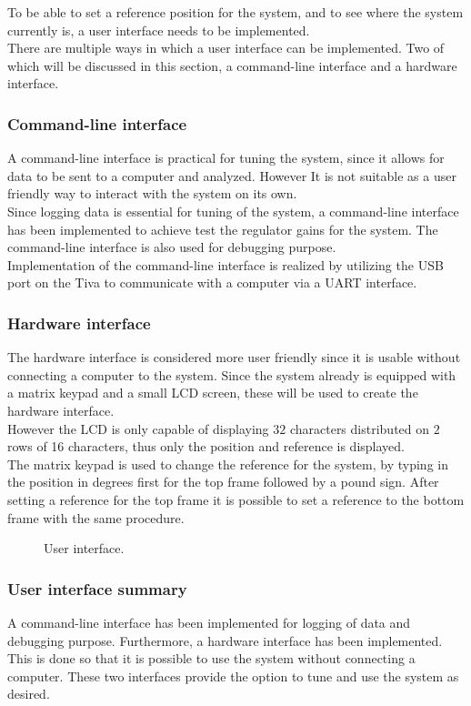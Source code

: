 \documentclass[../../../main]{subfiles}
\begin{document}
To be able to set a reference position for the system, and to see where the system currently is, a user interface needs to be implemented.\\
There are multiple ways in which a user interface can be implemented.
Two of which will be discussed in this section, a command-line interface and a hardware interface.

\subsubsection{Command-line interface}%
\label{ssub:command-line_interface}
A command-line interface is practical for tuning the system, since it allows for data to be sent to a computer and analyzed.
However It is not suitable as a user friendly way to interact with the system on its own.
\\
Since logging data is essential for tuning of the system, a command-line interface has been implemented to achieve test the regulator gains for the system.
The command-line interface is also used for debugging purpose.
\\
Implementation of the command-line interface is realized by utilizing the USB port on the Tiva to communicate with a computer via a UART interface.

\subsubsection{Hardware interface}%
\label{ssub:hardware_interface}
The hardware interface is considered more user friendly since it is usable without connecting a computer to the system.
Since the system already is equipped with a matrix keypad and a small LCD screen, these will be used to create the hardware interface.
\\
However the LCD is only capable of displaying $32$ characters distributed on $2$ rows of 16 characters, thus only the position and reference is displayed.
\\
The matrix keypad is used to change the reference for the system, by typing in the position in degrees first for the top frame followed by a pound sign. 
After setting a reference for the top frame it is possible to set a reference to the bottom frame with the same procedure. 

\begin{figure}[H]
  \centering
  \def\svgwidth{\textwidth}
  
  \caption{User interface.}
  \label{fig:User_interface}
\end{figure}

\subsubsection{User interface summary}%
\label{ssub:user_interface_summary}

A command-line interface has been implemented for logging of data and debugging purpose.
Furthermore, a hardware interface has been implemented. 
This is done so that it is possible to  use the system without connecting a computer.
These two interfaces provide the option to tune and use the system as desired.
\end{document}

